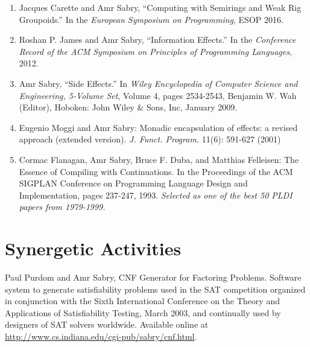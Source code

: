 \documentclass[11pt]{article}
\begin{document}
\begin{enumerate}

\item Jacques Carette and Amr Sabry, ``Computing with Semirings and Weak Rig
  Groupoids.'' In the \emph{European Symposium on Programming}, ESOP 2016.

\item Roshan P. James and Amr Sabry, ``Information Effects.'' In the
  \emph{Conference Record of the ACM Symposium on Principles of Programming
  Languages}, 2012.

\item Amr Sabry, ``Side Effects.'' In \emph{Wiley Encyclopedia of Computer
  Science and Engineering, 5-Volume Set}, Volume 4, pages 2534-2543, Benjamin
  W. Wah (Editor), Hoboken: John Wiley \& Sons, Inc, January 2009.

\item Eugenio Moggi and Amr Sabry: Monadic encapsulation of effects: 
a revised approach (extended version). \emph{J. Funct. Program.} 11(6):
591-627 (2001)

\item Cormac Flanagan, Amr Sabry, Bruce F. Duba, and Matthias Felleisen:
The Essence of Compiling with Continuations. In the Proceedings of the ACM
SIGPLAN Conference on Programming Language Design and Implementation, pages
237-247, 1993. \emph{Selected as one of the best 50 PLDI papers from
1979-1999.}
\end{enumerate}

\section*{Synergetic Activities}

Paul Purdom and Amr Sabry, CNF Generator for Factoring Problems.  Software
system to generate satisfiability problems used in the SAT competition
organized in conjunction with the Sixth International Conference on the
Theory and Applications of Satisfiability Testing, March 2003, and
continually used by designers of SAT solvers worldwide. Available online at
\url{http://www.cs.indiana.edu/cgi-pub/sabry/cnf.html}.
\end{document}
